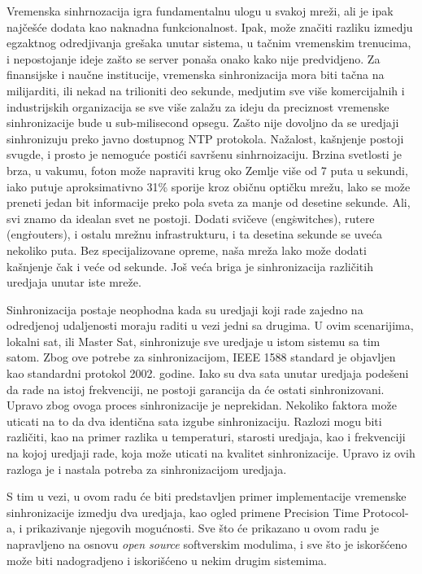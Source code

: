 \documentclass[a4paper,12pt, master]{etf}
\begin{document}
	Vremenska sinhrnozacija igra fundamentalnu ulogu u svakoj mre\v{z}i, ali je
	ipak naj\v{c}e\v{s}\'{c}e dodata kao naknadna funkcionalnost. Ipak,
	mo\v{z}e zna\v{c}iti razliku izmedju egzaktnog odredjivanja gre\v{s}aka
	unutar sistema, u ta\v{c}nim vremenskim trenucima, i nepostojanje ideje
	za\v{s}to se server pona\v{s}a onako kako nije predvidjeno. Za finansijske
	i nau\v{c}ne institucije, vremenska sinhronizacija mora biti ta\v{c}na na
	milijarditi, ili nekad na trilioniti deo sekunde, medjutim sve vi\v{s}e
	komercijalnih i industrijskih organizacija se sve vi\v{s}e zala\v{z}u za
	ideju da preciznost vremenske sinhronizacije bude u sub-milisecond opsegu.
	Za\v{s}to nije dovoljno da se uredjaji sinhronizuju preko javno dostupnog
	NTP protokola. Na\v{z}alost, ka\v{s}njenje postoji svugde, i prosto je
	nemogu\'{c}e posti\'{c}i savr\v{s}enu sinhrnoizaciju. Brzina svetlosti je
	brza, u vakumu, foton mo\v{z}e napraviti krug oko Zemlje vi\v{s}e od 7 puta
	u sekundi, iako putuje aproksimativno 31\% sporije kroz obi\v{c}nu
	opti\v{c}ku mre\v{z}u, lako se mo\v{z}e preneti jedan bit informacije preko
	pola sveta za manje od desetine sekunde. Ali, svi znamo da idealan svet ne
	postoji. Dodati svi\v{c}eve (eng\. switches), rutere (eng\. routers), i
	ostalu mre\v{z}nu infrastrukturu, i ta desetina sekunde se uve\'{c}a
	nekoliko puta. Bez specijalizovane opreme, na\v{s}a mre\v{z}a lako mo\v{z}e
	dodati ka\v{s}njenje \v{c}ak i ve\'{c}e od sekunde. Jo\v{s} ve\'{c}a briga
	je sinhronizacija razli\v{c}itih uredjaja unutar iste mre\v{z}e.

	Sinhronizacija postaje neophodna kada su uredjaji koji rade zajedno na
	odredjenoj udaljenosti moraju raditi u vezi jedni sa drugima. U ovim
	scenarijima, lokalni sat, ili Master Sat, sinhronizuje sve uredjaje u istom
	sistemu sa tim satom. Zbog ove potrebe za sinhronizacijom, IEEE 1588
	standard je objavljen kao standardni protokol 2002. godine. Iako su dva
	sata unutar uredjaja pode\v{s}eni da rade na istoj frekvenciji, ne postoji
	garancija da \'{c}e ostati sinhronizovani. Upravo zbog ovoga proces
	sinhronizacije je neprekidan. Nekoliko faktora mo\v{z}e uticati na to da
	dva identi\v{c}na sata izgube sinhronizaciju. Razlozi mogu biti
	razli\v{c}iti, kao na primer razlika u temperaturi, starosti uredjaja, kao
	i frekvenciji na kojoj uredjaji rade, koja mo\v{z}e uticati na kvalitet
	sinhronizacije. Upravo iz ovih razloga je i	nastala potreba za
	sinhronizacijom uredjaja.

	S tim u vezi, u ovom radu \'{c}e biti predstavljen primer implementacije
	vremenske sinhronizacije izmedju dva uredjaja, kao ogled primene Precision
	Time Protocol-a, i prikazivanje njegovih mogu\'{c}nosti. Sve \v{s}to \'{c}e
	prikazano u ovom radu je napravljeno na osnovu \textit{open source}
	softverskim modulima, i sve \v{s}to je iskor\v{s}\'{c}eno mo\v{z}e biti
	nadogradjeno i iskori\v{s}\'{c}eno u nekim drugim sistemima.
\end{document}
